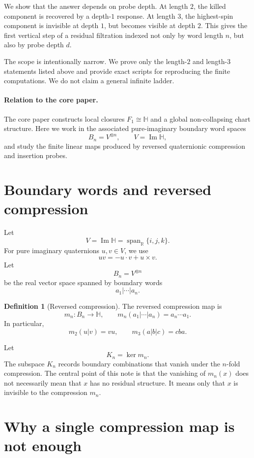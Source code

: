 \documentclass[11pt]{article}
\theoremstyle{definition}
\newtheorem{definition}[theorem]{Definition}
\newcommand{\Ker}{\operatorname{ker}}
\begin{document}
We show that the answer depends on probe depth.
At length $2$, the killed component is recovered by a depth-$1$ response.
At length $3$, the highest-spin component is invisible at depth $1$, but becomes visible at depth $2$.
This gives the first vertical step of a residual filtration indexed not only by word length $n$, but also by probe depth $d$.

The scope is intentionally narrow.
We prove only the length-$2$ and length-$3$ statements listed above and provide exact scripts for reproducing the finite computations.
We do not claim a general infinite ladder.

\paragraph{Relation to the core paper.}
The core paper constructs local closures $F_1\cong\mathbb{H}$ and a global non-collapsing chart structure.
Here we work in the associated pure-imaginary boundary word spaces
\[
  B_n=V^{\otimes n},\qquad V=\operatorname{Im}\mathbb{H},
\]
and study the finite linear maps produced by reversed quaternionic compression and insertion probes.

\section{Boundary words and reversed compression}

Let
\[
  V=\operatorname{Im}\mathbb{H}=\operatorname{span}_{\mathbb{R}}\{i,j,k\}.
\]
For pure imaginary quaternions $u,v\in V$, we use
\[
  uv=-u\cdot v+u\times v.
\]
Let
\[
  B_n=V^{\otimes n}
\]
be the real vector space spanned by boundary words
\[
  a_1|\cdots|a_n.
\]

\begin{definition}[Reversed compression]
The reversed compression map is
\[
  m_n:B_n\to\mathbb{H},
  \qquad
  m_n(a_1|\cdots|a_n)=a_n\cdots a_1.
\]
In particular,
\[
  m_2(u|v)=vu,
  \qquad
  m_3(a|b|c)=cba.
\]
\end{definition}

Let
\[
  K_n=\Ker m_n.
\]
The subspace $K_n$ records boundary combinations that vanish under the $n$-fold compression.
The central point of this note is that the vanishing of $m_n(x)$ does not necessarily mean that $x$ has no residual structure.
It means only that $x$ is invisible to the compression $m_n$.

\section{Why a single compression map is not enough}
\end{document}
